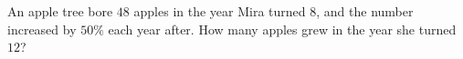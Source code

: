 An apple tree bore $48$ apples in the year Mira turned $8$, and the number increased by $50\%$ each year after. How many apples grew in the year she turned $12$?
